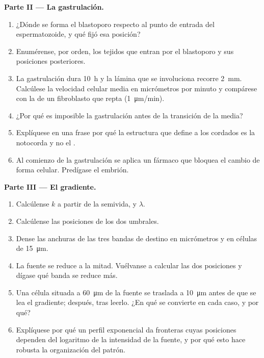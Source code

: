 \begin{problem}
\medskip
\noindent\textbf{Parte II --- La gastrulación.}
\begin{enumerate}[resume]
  \item ¿Dónde se forma el blastoporo respecto al punto de entrada del
        espermatozoide, y qué fijó esa posición?
  \item Enumérense, por orden, los tejidos que entran por el blastoporo y
        sus posiciones posteriores.
  \item La gastrulación dura \qty{10}{h} y la lámina que se involuciona
        recorre \qty{2}{mm}. Calcúlese la velocidad celular media en
        micrómetros por minuto y compárese con la de un fibroblasto que
        repta (\qty{1}{\micro m/min}).
  \item ¿Por qué es imposible la gastrulación antes de la transición de
        la  media?
  \item Explíquese en una frase por qué la estructura que define a los
        cordados es la notocorda y no el .
  \item Al comienzo de la gastrulación se aplica un fármaco que bloquea el
        cambio de forma celular. Predígase el embrión.
\end{enumerate}

\medskip
\noindent\textbf{Parte III --- El gradiente.}
\begin{enumerate}[resume]
  \item Calcúlense $k$ a partir de la semivida, y $\lambda$.
  \item Calcúlense las posiciones de los dos umbrales.
  \item Dense las anchuras de las tres bandas de destino en micrómetros y
        en células de \qty{15}{\micro m}.
  \item La fuente se reduce a la mitad. Vuélvanse a calcular las dos
        posiciones y dígase qué banda se reduce más.
  \item Una célula situada a \qty{60}{\micro m} de la fuente se traslada a
        \qty{10}{\micro m} antes de que se lea el gradiente; después, tras
        leerlo. ¿En qué se convierte en cada caso, y por qué?
  \item Explíquese por qué un perfil exponencial da fronteras cuyas
        posiciones dependen del logaritmo de la intensidad de la fuente, y
        por qué esto hace robusta la organización del patrón.
\end{enumerate}


\end{problem}
